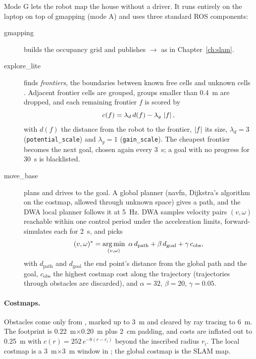 Mode G lets the robot map the house without a driver. It runs entirely on
the laptop on top of gmapping (mode A) and uses three standard ROS
components:
\begin{description}
\item[gmapping] builds the occupancy grid and publishes $\to$
  as in Chapter~\ref{ch:slam}.
\item[explore\_lite] finds \emph{frontiers}, the boundaries between known
  free cells and unknown cells \cite{yamauchi1997frontier}. Adjacent
  frontier cells are grouped, groups smaller than \SI{0.4}{m} are dropped,
  and each remaining frontier $f$ is scored by
  \begin{equation}\label{eq:frontier}
  c(f)=\lambda_d\,d(f)-\lambda_g\,\left\lvert f \right\rvert,
  \end{equation}
  with $d(f)$ the distance from the robot to the frontier, $\left\lvert f \right\rvert$ its size,
  $\lambda_d=3$ (\texttt{potential\_scale}) and $\lambda_g=1$
  (\texttt{gain\_scale}). The cheapest frontier becomes the next goal, chosen
  again every \SI{3}{s}; a goal with no progress for \SI{30}{s} is
  blacklisted.
\item[move\_base] plans and drives to the goal. A global planner (navfn,
  Dijkstra's algorithm on the costmap, allowed through unknown space) gives a
  path, and the DWA local planner \cite{fox1997dynamic} follows it at
  \SI{5}{Hz}. DWA samples velocity pairs $(v,\omega)$ reachable within one
  control period under the acceleration limits, forward-simulates each for
  \SI{2}{s}, and picks
  \begin{equation}\label{eq:dwa}
  (v,\omega)^\ast=\operatorname*{arg\,min}_{(v,\omega)}\
  \alpha\,d_{\mathrm{path}}+\beta\,d_{\mathrm{goal}}+\gamma\,c_{\mathrm{obs}},
  \end{equation}
  with $d_{\mathrm{path}}$ and $d_{\mathrm{goal}}$ the end point's distance
  from the global path and the goal, $c_{\mathrm{obs}}$ the highest costmap cost
  along the trajectory (trajectories through obstacles are discarded), and
  $\alpha=32$, $\beta=20$, $\gamma=0.05$.
\end{description}

\paragraph{Costmaps.} Obstacles come only from , marked up to
\SI{3}{m} and cleared by ray tracing to \SI{6}{m}. The footprint is
\SI{0.22}{m}$\times$\SI{0.20}{m} plus \SI{2}{cm} padding, and costs are
inflated out to \SI{0.25}{m} with
$c(r)=252\,e^{-8(r-r_i)}$ beyond the inscribed radius $r_i$. The local
costmap is a \SI{3}{m}$\times$\SI{3}{m} window in \frm{odom}; the global
costmap is the SLAM map.

